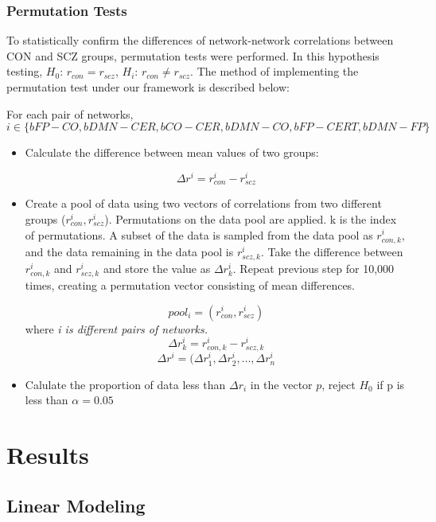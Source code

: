 \documentclass[11pt]{article}
\begin{document}
\subsubsection{Permutation Tests}

To statistically confirm the differences of network-network correlations between CON and SCZ groups, permutation tests were performed. In this hypothesis testing, $H_{0}$: $r_{con} = r_{scz}$, $H_{i}$: $r_{con} \neq r_{scz}$.
The method of implementing the permutation test under our framework is described below:

For each pair of networks, $$i \in \{ bFP-CO, bDMN-CER, bCO-CER, bDMN-CO, bFP-CERT, bDMN-FP \}$$ 
\begin{itemize}
\item Calculate the difference between mean values of two groups:

$$ \Delta r^i =  r_{con}^i - r_{scz}^i $$ 

\item  Create a pool of data using two vectors of correlations from two different groups ($r_{con}^i, r_{scz}^i$). Permutations on the data pool are applied. k is the index of permutations. A subset of the data is sampled from the data pool as $ r_{con, k}^i$, and the data remaining in the data pool is $r_{scz, k}^i$. Take the difference between $ r_{con, k}^i$ and  $r_{scz, k}^i$ and store the value as $\Delta r_{k}^i$. Repeat previous step for 10,000 times, creating a permutation vector consisting of mean differences.

$$ pool_{i} = (r_{con}^i, r_{scz}^i) $$ where \textit{ i is different pairs of networks.}
$$ \Delta r_{k}^i = r_{con,k}^i - r_{scz,k}^i $$ 
$$ \Delta r^i = (\Delta r_{1}^i, \Delta r_{2}^i, \dots, \Delta r_{n}^i $$

\item Calulate the proportion of data less than $\Delta r_{i}$ in the vector $p$, reject $H_0$ if p is less than $\alpha = 0.05$

\end{itemize}

\section{Results}

\subsection{Linear Modeling}
\end{document}
